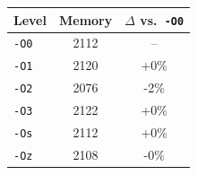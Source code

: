 \begin{tabular*}{\columnwidth}{@{\extracolsep\fill}lcc@{\extracolsep\fill}}
\toprule
\textbf{Level} & \textbf{Memory} & \textbf{$\Delta$ vs.\ \texttt{-O0}} \\
\midrule
\texttt{-O0} & 2112 & -- \\
\texttt{-O1} & 2120 & +0\% \\
\texttt{-O2} & 2076 & -2\% \\
\texttt{-O3} & 2122 & +0\% \\
\texttt{-Os} & 2112 & +0\% \\
\texttt{-Oz} & 2108 & -0\% \\
\bottomrule
\end{tabular*}

